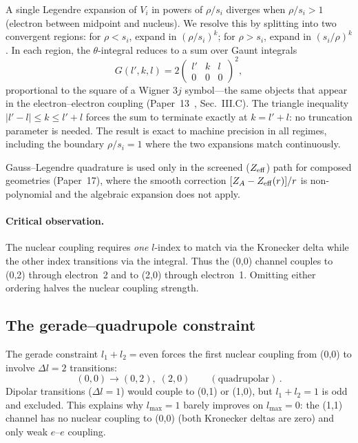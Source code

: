 \documentclass[aps,pra,twocolumn,superscriptaddress,longbibliography]{revtex4-2}
\begin{document}
A single Legendre expansion of $V_i$ in powers of $\rho/s_i$
diverges when $\rho/s_i > 1$ (electron between midpoint and
nucleus).  We resolve this by splitting into two convergent regions:
for $\rho < s_i$, expand in $(\rho/s_i)^k$; for $\rho > s_i$,
expand in $(s_i/\rho)^k$.  In each region, the $\theta$-integral
reduces to a sum over Gaunt integrals
\begin{equation}
  G(l', k, l) = 2\begin{pmatrix} l' & k & l \\ 0 & 0 & 0
  \end{pmatrix}^{\!2},
  \label{eq:gaunt_nuc}
\end{equation}
proportional to the square of a Wigner $3j$ symbol---the same
objects that appear in the electron--electron coupling
(Paper~13~\cite{paper13}, Sec.~III.C).
The triangle inequality $|l' - l| \leq k \leq l' + l$ forces
the sum to terminate exactly at $k = l' + l$: no truncation
parameter is needed.  The result is exact to machine precision
in all regimes, including the boundary $\rho/s_i = 1$ where
the two expansions match continuously.

Gauss--Legendre quadrature is used only in the screened
($Z_{\rm eff}$) path for composed geometries (Paper~17), where
the smooth correction $[Z_A - Z_{\rm eff}(r)]/r$ is
non-polynomial and the algebraic expansion does not apply.

\paragraph{Critical observation.}
The nuclear coupling requires \emph{one} $l$-index to match via the
Kronecker delta while the other index transitions via the integral.
Thus the (0,0) channel couples to (0,2) through electron~2 and to
(2,0) through electron~1.  Omitting either ordering halves the
nuclear coupling strength.

\subsection{The gerade--quadrupole constraint}

The gerade constraint $l_1 + l_2 = \text{even}$ forces the first
nuclear coupling from (0,0) to involve $\Delta l = 2$ transitions:
\begin{equation}
  (0,0) \longrightarrow (0,2),\;(2,0)\qquad(\text{quadrupolar})\,.
  \label{eq:quadrupole}
\end{equation}
Dipolar transitions ($\Delta l = 1$) would couple to (0,1) or (1,0),
but $l_1 + l_2 = 1$ is odd and excluded.  This explains why $l_{\max}=1$
barely improves on $l_{\max}=0$: the (1,1) channel has no nuclear
coupling to (0,0) (both Kronecker deltas are zero) and only weak
$e$--$e$ coupling.
\end{document}
